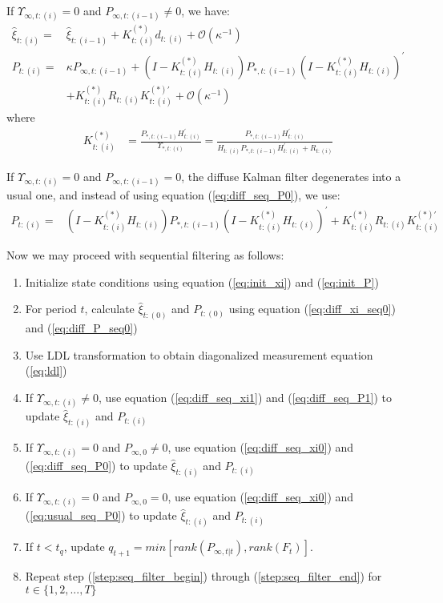 \documentclass[12pt]{article}
\newenvironment{boenumerate}
    {\begin{enumerate}\renewcommand\labelenumi{\textbf\theenumi}}
    {\end{enumerate}}
\numberwithin{equation}{section}
\begin{document}
If $\Upsilon_{\infty,t:(i)}=0$ and $P_{\infty,t:(i-1)}\neq 0$, we have:
\begin{align}
    \hat{\xi}_{t:(i)} =& \hat{\xi}_{t:(i-1)} + K_{t:(i)}^{(*)}d_{t:(i)} + \mathcal{O}(\kappa^{-1}) \label{eq:diff_seq_xi0} \\
    P_{t:(i)} =& \kappa P_{\infty,t:(i-1)} + (I-K_{t:(i)}^{(*)}H_{t:(i)})P_{*,t:(i-1)}(I-K_{t:(i)}^{(*)}H_{t:(i)})^{'} \label{eq:diff_seq_P0} \\
        &+ K_{t:(i)}^{(*)}R_{t:(i)}K_{t:(i)}^{(*)'} + \mathcal{O}(\kappa^{-1}) \nonumber 
\end{align}
where
\begin{align*}
    K_{t:(i)}^{(*)} &= \frac{P_{*,t:(i-1)}H_{t:(i)}^{'}}{\Upsilon_{*,t:(i)}} = \frac{P_{*,t:(i-1)}H_{t:(i)}^{'}}{H_{t:(i)}P_{*,t:(i-1)}H_{t:(i)}^{'} + R_{t:(i)}}
\end{align*}

If $\Upsilon_{\infty,t:(i)}=0$ and $P_{\infty,t:(i-1)}=0$, the diffuse Kalman filter degenerates into a usual one, and instead of using equation (\ref{eq:diff_seq_P0}), we use:
\begin{align}
    P_{t:(i)} =& (I-K_{t:(i)}^{(*)}H_{t:(i)})P_{*,t:(i-1)}(I-K_{t:(i)}^{(*)}H_{t:(i)})^{'} + K_{t:(i)}^{(*)}R_{t:(i)}K_{t:(i)}^{(*)'} \label{eq:usual_seq_P0} 
\end{align}

Now we may proceed with sequential filtering as follows:
\begin{boenumerate}
    \item Initialize state conditions using equation (\ref{eq:init_xi}) and (\ref{eq:init_P}) 
    \item For period $t$, calculate $\hat{\xi}_{t:(0)}$ and $P_{t:{(0)}}$ using equation (\ref{eq:diff_xi_seq0}) and (\ref{eq:diff_P_seq0}) \label{step:seq_filter_begin}
    \item Use LDL transformation to obtain diagonalized measurement equation (\ref{eq:ldl})
    \item If $\Upsilon_{\infty,t:(i)}\neq0$, use equation (\ref{eq:diff_seq_xi1}) and (\ref{eq:diff_seq_P1}) to update $\hat{\xi}_{t:(i)}$ and $P_{t:(i)}$
    \item If $\Upsilon_{\infty,t:(i)}=0$ and $P_{\infty,0}\neq0$, use equation (\ref{eq:diff_seq_xi0}) and (\ref{eq:diff_seq_P0}) to update $\hat{\xi}_{t:(i)}$ and $P_{t:(i)}$ 
    \item If $\Upsilon_{\infty,t:(i)}=0$ and $P_{\infty,0}=0$, use equation (\ref{eq:diff_seq_xi0}) and (\ref{eq:usual_seq_P0}) to update $\hat{\xi}_{t:(i)}$ and $P_{t:(i)}$ 
    \item If $t<t_q$, update $q_{t+1} = min[rank(P_{\infty,t|t}), rank(F_t)]$. \label{step:seq_filter_end}
    \item Repeat step (\ref{step:seq_filter_begin}) through (\ref{step:seq_filter_end}) for $t\in\{1,2,...,T\}$
\end{boenumerate}
\end{document}
